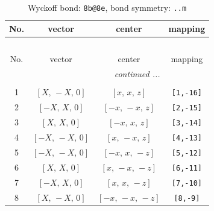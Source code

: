 \documentclass[fleqn,8pt]{jsarticle}
\begin{document}
\begin{longtable}{cccc}
\caption{Wyckoff bond: {\tt 8b@8e}, bond symmetry: {\tt ..m}}
 \\
 \hline \hline
No. & vector & center & mapping \\ \hline \endfirsthead

\multicolumn{3}{l}{\tablename\ \thetable{}} \\
 \hline \hline
No. & vector & center & mapping \\ \hline \endhead

 \hline \hline
\multicolumn{3}{r}{\footnotesize\it continued ...} \\ \endfoot

 \hline \hline
\multicolumn{3}{r}{} \\ \endlastfoot

1 & $\left[ X,\, - X,\, 0 \right]$ & $\left[ x,\, x,\, z \right]$ & {\tt [1,-16]} \\ \hline
2 & $\left[ - X,\, X,\, 0 \right]$ & $\left[ - x,\, - x,\, z \right]$ & {\tt [2,-15]} \\ \hline
3 & $\left[ X,\, X,\, 0 \right]$ & $\left[ - x,\, x,\, z \right]$ & {\tt [3,-14]} \\ \hline
4 & $\left[ - X,\, - X,\, 0 \right]$ & $\left[ x,\, - x,\, z \right]$ & {\tt [4,-13]} \\ \hline
5 & $\left[ - X,\, - X,\, 0 \right]$ & $\left[ - x,\, x,\, - z \right]$ & {\tt [5,-12]} \\ \hline
6 & $\left[ X,\, X,\, 0 \right]$ & $\left[ x,\, - x,\, - z \right]$ & {\tt [6,-11]} \\ \hline
7 & $\left[ - X,\, X,\, 0 \right]$ & $\left[ x,\, x,\, - z \right]$ & {\tt [7,-10]} \\ \hline
8 & $\left[ X,\, - X,\, 0 \right]$ & $\left[ - x,\, - x,\, - z \right]$ & {\tt [8,-9]} \\
\end{longtable}
\renewcommand{\arraystretch}{1.2}
\end{document}
